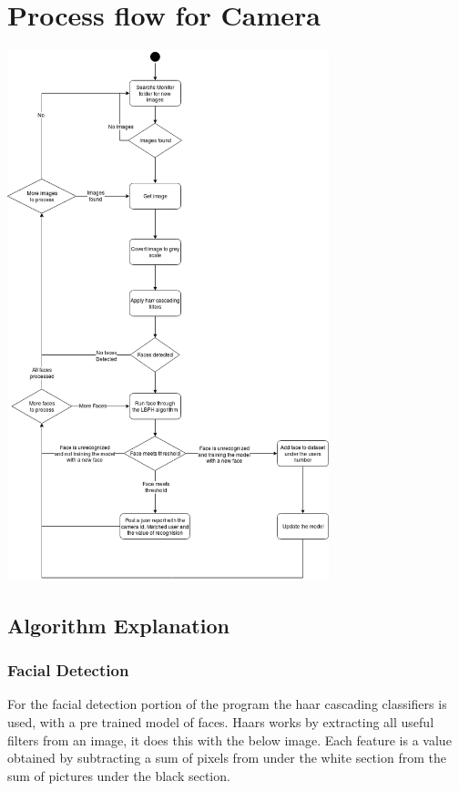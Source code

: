 \documentclass[
  english,
  a4paper,
,tablecaptionabove
]{scrartcl}
\begin{document}
\newpage

\hypertarget{process-flow-for-camera}{%
\section{Process flow for Camera}\label{process-flow-for-camera}}

\includegraphics[width=0.7\textwidth,height=\textheight]{images/ppm-images/camera-flow.png}

\newpage

\hypertarget{algorithm-explanation}{%
\subsection{Algorithm Explanation}\label{algorithm-explanation}}

\hypertarget{facial-detection}{%
\subsubsection{Facial Detection}\label{facial-detection}}

For the facial detection portion of the program the haar cascading
classifiers is used, with a pre trained model of faces. Haars works by
extracting all useful filters from an image, it does this with the below
image. Each feature is a value obtained by subtracting a sum of pixels
from under the white section from the sum of pictures under the black
section.
\end{document}
